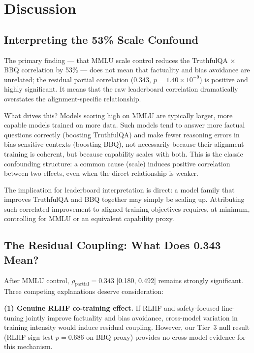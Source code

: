 \section{Discussion}
\label{sec:discussion}

\subsection{Interpreting the 53\% Scale Confound}

The primary finding --- that MMLU scale control reduces the TruthfulQA $\times$ BBQ correlation by 53\% --- does not mean that factuality and bias avoidance are unrelated; the residual partial correlation ($0.343$, $p = 1.40 \times 10^{-9}$) is positive and highly significant. It means that the raw leaderboard correlation dramatically overstates the alignment-specific relationship.

What drives this? Models scoring high on MMLU are typically larger, more capable models trained on more data. Such models tend to answer more factual questions correctly (boosting TruthfulQA) and make fewer reasoning errors in bias-sensitive contexts (boosting BBQ), not necessarily because their alignment training is coherent, but because capability scales with both. This is the classic confounding structure: a common cause (scale) induces positive correlation between two effects, even when the direct relationship is weaker.

The implication for leaderboard interpretation is direct: a model family that improves TruthfulQA and BBQ together may simply be scaling up. Attributing such correlated improvement to aligned training objectives requires, at minimum, controlling for MMLU or an equivalent capability proxy.

\subsection{The Residual Coupling: What Does 0.343 Mean?}

After MMLU control, $\rho_{\text{partial}} = 0.343$ [0.180, 0.492] remains strongly significant. Three competing explanations deserve consideration:

\textbf{(1) Genuine RLHF co-training effect.} If RLHF and safety-focused fine-tuning jointly improve factuality and bias avoidance, cross-model variation in training intensity would induce residual coupling. However, our Tier~3 null result (RLHF sign test $p = 0.686$ on BBQ proxy) provides no cross-model evidence for this mechanism.

